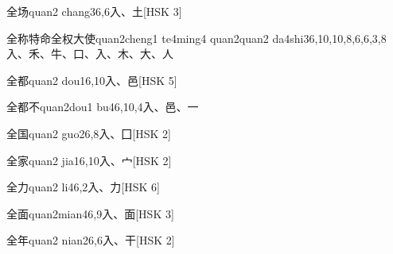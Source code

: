 \begin{EntryWithPhonetic}{全场}{quan2 chang3}{6,6}{⼊、⼟}[HSK 3]
\end{EntryWithPhonetic}

\begin{EntryWithPhonetic}{全称特命全权大使}{quan2cheng1 te4ming4 quan2quan2 da4shi3}{6,10,10,8,6,6,3,8}{⼊、⽲、⽜、⼝、⼊、⽊、⼤、⼈}
\end{EntryWithPhonetic}

\begin{EntryWithPhonetic}{全都}{quan2 dou1}{6,10}{⼊、⾢}[HSK 5]
\end{EntryWithPhonetic}

\begin{EntryWithPhonetic}{全都不}{quan2dou1 bu4}{6,10,4}{⼊、⾢、⼀}
\end{EntryWithPhonetic}

\begin{EntryWithPhonetic}{全国}{quan2 guo2}{6,8}{⼊、⼞}[HSK 2]
\end{EntryWithPhonetic}

\begin{EntryWithPhonetic}{全家}{quan2 jia1}{6,10}{⼊、⼧}[HSK 2]
\end{EntryWithPhonetic}

\begin{EntryWithPhonetic}{全力}{quan2 li4}{6,2}{⼊、⼒}[HSK 6]
\end{EntryWithPhonetic}

\begin{EntryWithPhonetic}{全面}{quan2mian4}{6,9}{⼊、⾯}[HSK 3]
\end{EntryWithPhonetic}

\begin{EntryWithPhonetic}{全年}{quan2 nian2}{6,6}{⼊、⼲}[HSK 2]
\end{EntryWithPhonetic}

